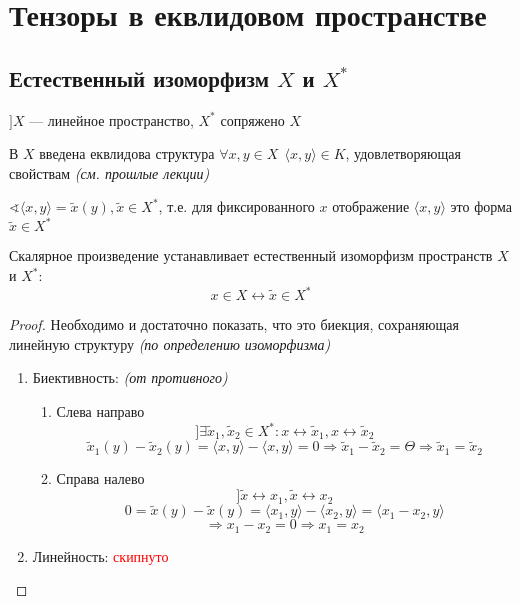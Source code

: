 

\cfoot{}

\renewcommand{\thesubsection}{\arabic{subsection}.}
\makeatletter
\renewcommand*{\@seccntformat}[1]{\csname the#1\endcsname\hspace{0.1cm}}
\makeatother



\section*{Тензоры в еквлидовом пространстве}

\subsection{Естественный изоморфизм $X$ и $X^*$}

$] X$ --- линейное пространство, $X^*$ сопряжено $X$

В $X$ введена еквлидова структура $\forall x,y\in X \ \ \langle x,y\rangle \in K$, удовлетворяющая свойствам \textit{(см. прошлые лекции)}

$\sphericalangle \langle x,y\rangle = \tilde x(y), \tilde x\in X^*$, т.е. для фиксированного $x$ отображение $\langle x,y\rangle$ это форма $\tilde x\in X^*$

\begin{lemma}
    Скалярное произведение устанавливает естественный изоморфизм пространств $X$ и $X^*$:
    $$x\in X \leftrightarrow \tilde x\in X^*$$
\end{lemma}
\begin{proof}
    Необходимо и достаточно показать, что это биекция, сохраняющая линейную структуру \textit{(по определению изоморфизма)}

    \begin{enumerate}
        \item Биективность: \textit{(от противного)}
        \begin{enumerate}
            \item Слева направо $$] \exists \tilde x_1, \tilde x_2 \in X^* : x\leftrightarrow \tilde x_1, x\leftrightarrow \tilde x_2$$
            $$\tilde x_1(y) - \tilde x_2(y) = \langle x, y\rangle - \langle x, y\rangle = 0 \Rightarrow \tilde x_1 - \tilde x_2 = \Theta \Rightarrow \tilde x_1 = \tilde x_2$$
        
            \item Справа налево $$] \tilde x \leftrightarrow x_1, \tilde x \leftrightarrow x_2$$
            $$0 = \tilde x(y) - \tilde x(y) = \langle x_1, y\rangle - \langle x_2, y\rangle = \langle x_1-x_2, y\rangle$$
            $$\Rightarrow x_1-x_2=0\Rightarrow x_1=x_2$$
        \end{enumerate}
        \item Линейность: \textcolor{red}{скипнуто}
    \end{enumerate}
\end{proof}

